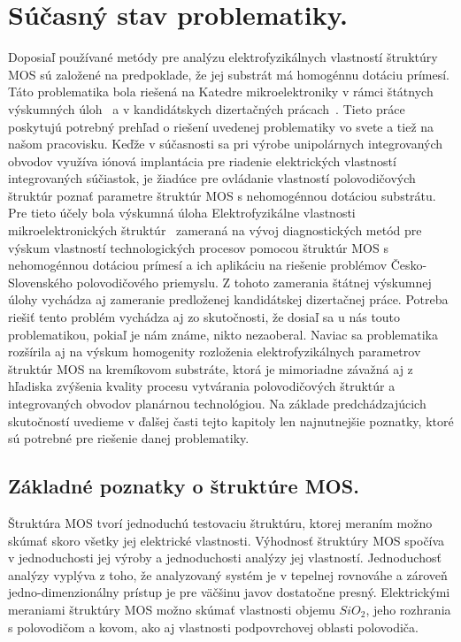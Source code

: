
\chapter{Súčasný stav problematiky.}%
\label{Chapter1} %

Doposiaľ používané metódy pre analýzu elektrofyzikálnych vlastností
štruktúry MOS sú založené na predpoklade, že jej substrát má homogénnu
dotáciu prímesí. Táto problematika bola riešená na Katedre
mikroelektroniky v rámci štátnych výskumných úloh~\cite{1.1,1.2} a v
kandidátskych dizertačných prácach~\cite{1.5,1.6,1.7,1.8}. Tieto práce
poskytujú potrebný prehľad o riešení uvedenej problematiky vo svete a
tiež na našom pracovisku. Keďže v súčasnosti sa pri výrobe
unipolárnych integrovaných obvodov využíva iónová implantácia pre
riadenie elektrických vlastností integrovaných súčiastok, je žiadúce
pre ovládanie vlastností polovodičových štruktúr poznať parametre
štruktúr MOS s nehomogénnou dotáciou substrátu. Pre tieto účely bola
výskumná úloha Elektrofyzikálne vlastnosti mikroelektronických
štruktúr~\cite{1.3,1.4} zameraná na vývoj diagnostických metód pre
výskum vlastností technologických procesov pomocou štruktúr MOS s
nehomogénnou dotáciou prímesí a ich aplikáciu na riešenie problémov
Česko-Slovenského polovodičového priemyslu. Z tohoto zamerania štátnej
výskumnej úlohy vychádza aj zameranie predloženej kandidátskej
dizertačnej práce. Potreba riešiť tento problém vychádza aj zo
skutočnosti, že dosiaľ sa u nás touto problematikou, pokiaľ je nám
známe, nikto nezaoberal. Naviac sa problematika rozšírila aj na výskum
homogenity rozloženia elektrofyzikálnych parametrov štruktúr MOS na
kremíkovom substráte, ktorá je mimoriadne závažná aj z hľadiska
zvýšenia kvality procesu vytvárania polovodičových štruktúr a
integrovaných obvodov planárnou technológiou. Na základe
predchádzajúcich skutočností uvedieme v ďalšej časti tejto kapitoly
len najnutnejšie poznatky, ktoré sú potrebné pre riešenie danej
problematiky.

\section{Základné poznatky o štruktúre MOS.}

Štruktúra MOS tvorí jednoduchú testovaciu štruktúru, ktorej meraním
možno skúmať skoro všetky jej elektrické vlastnosti. Výhodnosť
štruktúry MOS spočíva v jednoduchosti jej výroby a jednoduchosti
analýzy jej vlastností. Jednoduchosť analýzy vyplýva z toho, že
analyzovaný systém je v tepelnej rovnováhe a zároveň
jedno-dimenzionálny prístup je pre väčšinu javov dostatočne
presný. Elektrickými meraniami štruktúry MOS možno skúmať vlastnosti
objemu $SiO_2$, jeho rozhrania s polovodičom a kovom, ako aj
vlastnosti podpovrchovej oblasti polovodiča.

